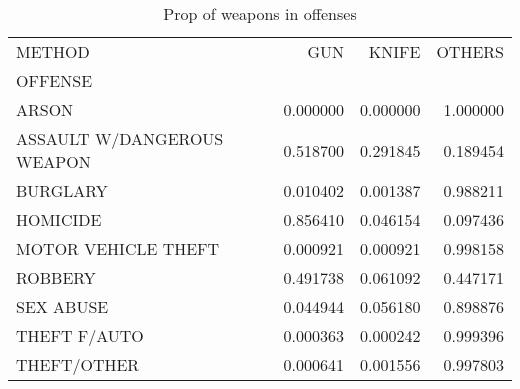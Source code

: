 \begin{table}
\centering
\caption{Prop of weapons in offenses}
\label{tab:method_offense_prop}
\begin{tabular}{lrrr}
\toprule
METHOD &       GUN &     KNIFE &    OTHERS \\
OFFENSE                    &           &           &           \\
\midrule
ARSON                      &  0.000000 &  0.000000 &  1.000000 \\
ASSAULT W/DANGEROUS WEAPON &  0.518700 &  0.291845 &  0.189454 \\
BURGLARY                   &  0.010402 &  0.001387 &  0.988211 \\
HOMICIDE                   &  0.856410 &  0.046154 &  0.097436 \\
MOTOR VEHICLE THEFT        &  0.000921 &  0.000921 &  0.998158 \\
ROBBERY                    &  0.491738 &  0.061092 &  0.447171 \\
SEX ABUSE                  &  0.044944 &  0.056180 &  0.898876 \\
THEFT F/AUTO               &  0.000363 &  0.000242 &  0.999396 \\
THEFT/OTHER                &  0.000641 &  0.001556 &  0.997803 \\
\bottomrule
\end{tabular}
\end{table}

